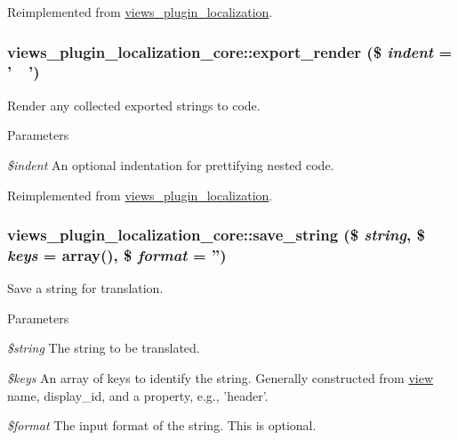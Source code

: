Reimplemented from \hyperlink{classviews__plugin__localization_a68c74a8cc99b0b52046064eac84cb07f}{views\_\-plugin\_\-localization}.\hypertarget{classviews__plugin__localization__core_a40776fb6a694863bfddc44954d1cb187}{
\subsubsection[{export\_\-render}]{\setlength{\rightskip}{0pt plus 5cm}views\_\-plugin\_\-localization\_\-core::export\_\-render (\$ {\em indent} = {\ttfamily '~~'})}}
\label{classviews__plugin__localization__core_a40776fb6a694863bfddc44954d1cb187}
Render any collected exported strings to code.


\begin{DoxyParams}{Parameters}
\item[{\em \$indent}]An optional indentation for prettifying nested code. \end{DoxyParams}


Reimplemented from \hyperlink{classviews__plugin__localization_ab53c5011e643fd284723970283c25d32}{views\_\-plugin\_\-localization}.\hypertarget{classviews__plugin__localization__core_a6d21acdb67193321115f053762f82e35}{
\subsubsection[{save\_\-string}]{\setlength{\rightskip}{0pt plus 5cm}views\_\-plugin\_\-localization\_\-core::save\_\-string (\$ {\em string}, \/  \$ {\em keys} = {\ttfamily array()}, \/  \$ {\em format} = {\ttfamily ''})}}
\label{classviews__plugin__localization__core_a6d21acdb67193321115f053762f82e35}
Save a string for translation.


\begin{DoxyParams}{Parameters}
\item[{\em \$string}]The string to be translated. \item[{\em \$keys}]An array of keys to identify the string. Generally constructed from \hyperlink{classview}{view} name, display\_\-id, and a property, e.g., 'header'. \item[{\em \$format}]The input format of the string. This is optional. \end{DoxyParams}


